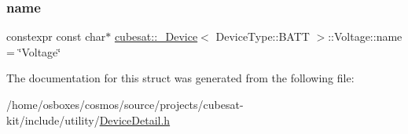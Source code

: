 \subsubsection{\texorpdfstring{name}{name}}
{\footnotesize\ttfamily constexpr const char$\ast$ \hyperlink{structcubesat_1_1__Device}{cubesat\+::\+\_\+\+Device}$<$ Device\+Type\+::\+B\+A\+TT $>$\+::Voltage\+::name = \char`\"{}Voltage\char`\"{}\hspace{0.3cm}{\ttfamily [static]}}



The documentation for this struct was generated from the following file\+:\begin{DoxyCompactItemize}
\item 
/home/osboxes/cosmos/source/projects/cubesat-\/kit/include/utility/\hyperlink{DeviceDetail_8h}{Device\+Detail.\+h}\end{DoxyCompactItemize}
